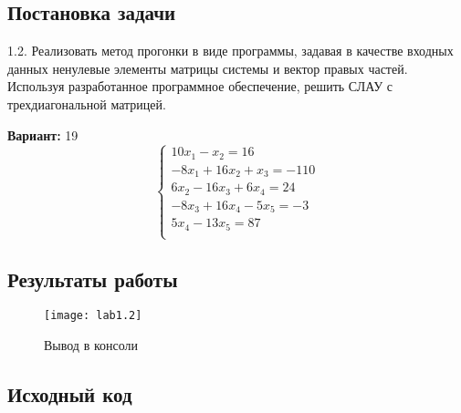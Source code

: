 \subsection{Постановка задачи}
1.2. Реализовать метод прогонки в виде программы, задавая в качестве входных данных ненулевые элементы матрицы системы и вектор правых частей. Используя разработанное программное обеспечение, решить СЛАУ с трехдиагональной матрицей. 

{\bfseries Вариант:} 19
\begin{equation}
        \left\{ 
        \begin{array}{ll} 
        10x_1 - x_2 = 16 \\
        -8x_1 + 16x_2 + x_3 = -110\\
        6x_2 - 16x_3 + 6x_4 = 24\\
        -8x_3 + 16x_4 - 5x_5 = -3\\
        5x_4 - 13x_5 = 87\\
        \end{array}\right.
\end{equation}
\pagebreak

\subsection{Результаты работы}

\begin{figure}[h!]
\centering
\texttt{[image: lab1.2]}
\caption{Вывод в консоли}
\end{figure}
\pagebreak

\vfill

\subsection{Исходный код}


\pagebreak
